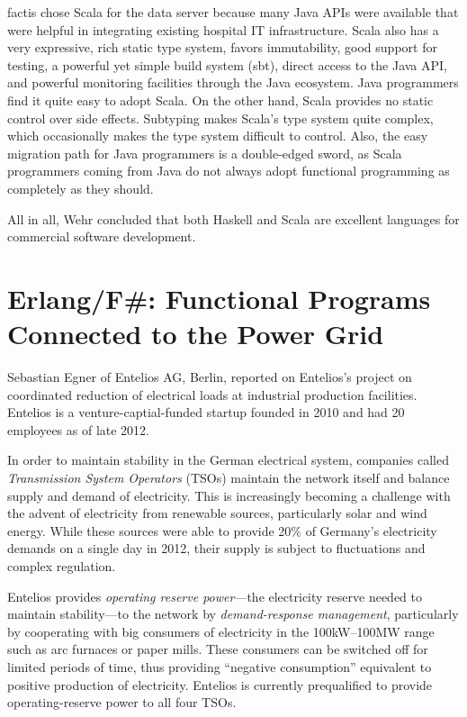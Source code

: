 \documentclass{jfp1}
\begin{document}
factis chose Scala for the data server because many Java APIs were
available that were helpful in integrating existing hospital IT
infrastructure.  Scala also has a very expressive, rich static type
system, favors immutability, good support for testing, a powerful yet
simple build system (sbt), direct access to the Java API, and powerful
monitoring facilities through the Java ecosystem.  Java programmers find
it quite easy to adopt Scala.  On the other hand, Scala provides no
static control over side effects.  Subtyping makes Scala's type system
quite complex, which occasionally makes the type system difficult to
control.  Also, the easy migration path for Java programmers is a
double-edged sword, as Scala programmers coming from Java do not
always adopt functional programming as completely as they should.

All in all, Wehr concluded that both Haskell and Scala are excellent
languages for commercial software development.

\section{Erlang/F\#: Functional Programs Connected to the Power Grid}

Sebastian Egner of Entelios AG, Berlin, reported on Entelios's project
on coordinated reduction of electrical loads at industrial production
facilities.  Entelios is a venture-captial-funded startup founded in 2010 and
had 20 employees as of late 2012.

In order to maintain stability in the German electrical system,
companies called
\textit{Transmission System Operators} (TSOs) maintain the network
itself and balance supply and demand of electricity.
This is increasingly becoming a challenge with the advent of
electricity from renewable sources, particularly solar and wind
energy.  While these sources were able to provide 20\% of Germany's
electricity demands on a single day in 2012, their supply is subject to
fluctuations and complex regulation.

Entelios provides \textit{operating reserve power}---the electricity
reserve needed to maintain stability---to the network by
\textit{demand-response management}, particularly by cooperating with
big consumers of electricity in the 100kW--100MW range such as arc
furnaces or paper mills.  These consumers can be switched off for
limited periods of time, thus providing ``negative consumption''
equivalent to positive production of electricity.  Entelios is
currently prequalified to provide operating-reserve power to all four
TSOs.
\end{document}
